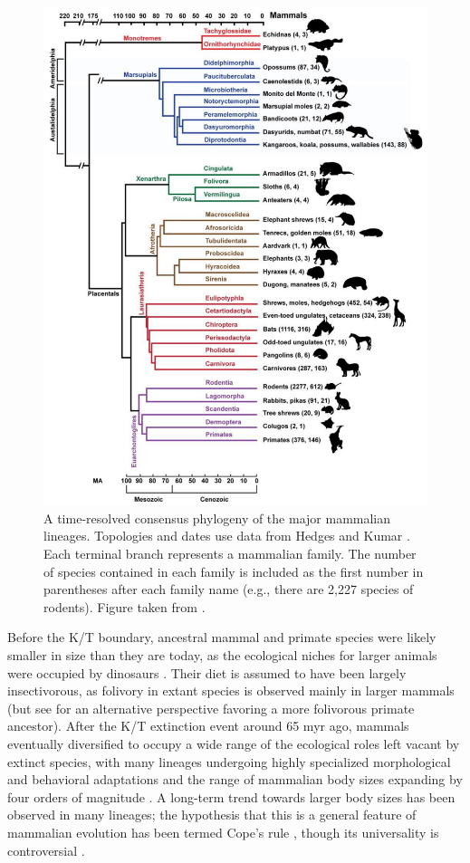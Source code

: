 \begin{figure}
\centering
\includegraphics[scale=0.5]{Figs/mammals_10k.pdf}
\caption{A time-resolved consensus phylogeny of the major mammalian
  lineages. Topologies and dates use data from Hedges and Kumar
  \citeyearpar{Hedges2009}. Each terminal branch represents a
  mammalian family. The number of species contained in each family is
  included as the first number in parentheses after each family name
  (e.g., there are 2,227 species of rodents). Figure taken from
  \citet{Haussler2009}. }
\label{fig_mammals_10k}
\end{figure}

Before the K/T boundary, ancestral mammal and primate species were
likely smaller in size than they are today, as the ecological niches
for larger animals were occupied by dinosaurs
\citep{Martin2008,Smith2010}. Their diet is assumed to have been
largely insectivorous, as folivory in extant species is observed
mainly in larger mammals \citep{Smith2010} (but see \citet{Martin2007}
for an alternative perspective favoring a more folivorous primate
ancestor). After the K/T extinction event around 65 \ac{myr} ago,
mammals eventually diversified to occupy a wide range of the
ecological roles left vacant by extinct species, with many lineages
undergoing highly specialized morphological and behavioral adaptations
and the range of mammalian body sizes expanding by four orders of
magnitude \citep{Alroy1998}. A long-term trend towards larger body
sizes has been observed in many lineages; the hypothesis that this is
a general feature of mammalian evolution has been termed Cope's rule
\citep{Alroy1998}, though its universality is controversial
\citep{Finarelli2006,Monroe2010}.

